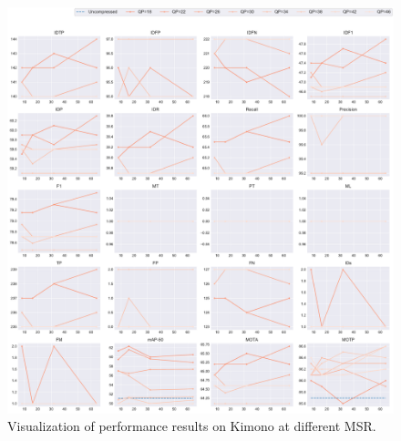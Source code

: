 \begin{figure}[!htbp]
\centering
\includegraphics[width=1.0\linewidth]{img/appendix/Kimono_all_multiplots_msr.pdf}
\caption[Visualization of performance results on Kimono at different MSR]
{Visualization of performance results on Kimono at different MSR.}
\label{fig:Kimono_all_msr}
\end{figure}



